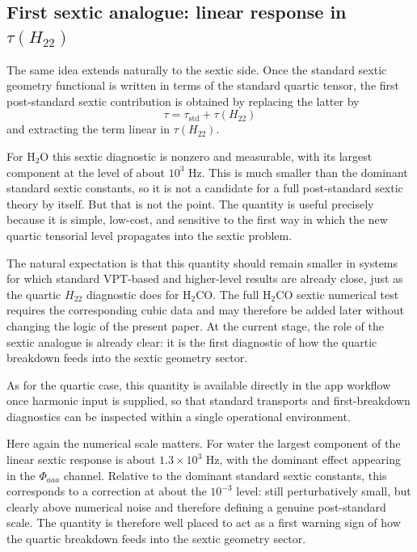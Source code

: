\documentclass[aip,jcp,reprint,floatfix]{revtex4-2}
\begin{document}
\subsection{First sextic analogue: linear response in \texorpdfstring{$\tau(H_{22})$}{tau(H22)}}

The same idea extends naturally to the sextic side. Once the standard sextic
geometry functional is written in terms of the standard quartic tensor, the
first post-standard sextic contribution is obtained by replacing the latter by
\begin{equation}
\tau = \tau_{\mathrm{std}} + \tau(H_{22})
\end{equation}
and extracting the term linear in $\tau(H_{22})$.

For H$_2$O this sextic diagnostic is nonzero and measurable, with its largest
component at the level of about $10^3$ Hz. This is much smaller than the
dominant standard sextic constants, so it is not a candidate for a full
post-standard sextic theory by itself. But that is not the point. The
quantity is useful precisely because it is simple, low-cost, and sensitive to
the first way in which the new quartic tensorial level propagates into the
sextic problem.

The natural expectation is that this quantity should remain smaller in systems
for which standard VPT-based and higher-level results are already close, just
as the quartic $H_{22}$ diagnostic does for H$_2$CO. The full H$_2$CO sextic
numerical test requires the corresponding cubic data and may therefore be
added later without changing the logic of the present paper. At the current
stage, the role of the sextic analogue is already clear: it is the first
diagnostic of how the quartic breakdown feeds into the sextic geometry sector.

As for the quartic case, this quantity is available directly in the app
workflow once harmonic input is supplied, so that standard transports and
first-breakdown diagnostics can be inspected within a single operational
environment.

Here again the numerical scale matters. For water the largest component of the
linear sextic response is about $1.3\times 10^3$ Hz, with the dominant effect
appearing in the $\Phi_{aaa}$ channel. Relative to the dominant standard
sextic constants, this corresponds to a correction at about the $10^{-3}$
level: still perturbatively small, but clearly above numerical noise and
therefore defining a genuine post-standard scale. The quantity is therefore
well placed to act as a first warning sign of how the quartic breakdown feeds
into the sextic geometry sector.
\end{document}
